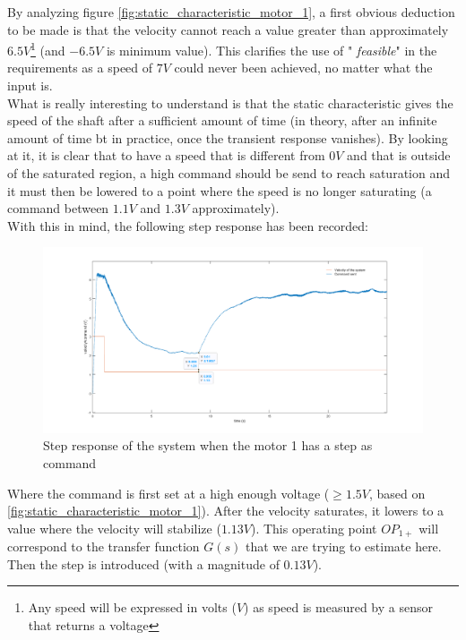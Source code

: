By analyzing figure \ref{fig:static_characteristic_motor_1}, a first obvious deduction to be made is that the velocity
cannot reach a value greater than approximately $6.5 V$\footnote{Any speed will be expressed in volts ($V$) as speed is
measured by a sensor that returns a voltage} (and $-6.5 V$ is minimum value). This clarifies the use of "\textit{
feasible}" in the requirements as a speed of $7 V$ could never been achieved, no matter what the input is.\\

What is really interesting to understand is that the static characteristic gives the speed of the shaft after a
sufficient amount of time (in theory, after an infinite amount of time bt in practice, once the transient response 
vanishes). By looking at it, it is clear that to have a speed that is different from $0 V$ and that is outside of the
saturated region, a high command should be send to reach saturation and it must then be lowered to a point where the
speed is no longer saturating (a command between $1.1 V$ and $1.3 V$ approximately).\\

With this in mind, the following step response has been recorded:

\begin{figure}[H]
    \centering
    \includegraphics[height=\textheight/3]{Pictures/step_response_positive_motor_1.png}
    \caption{Step response of the system when the motor 1 has a step as command}
    \label{fig:step_response_positive_motor_1}
\end{figure}


Where the command is first set at a high enough voltage ($\geq 1.5 V$, based on \ref{fig:static_characteristic_motor_1}). 
After the velocity saturates, it lowers to a value where the velocity will stabilize ($1.13 V$). This operating point 
\textit{$OP_{1+}$} will correspond to the transfer function $G(s)$ that we are trying to estimate here. Then the step is
introduced (with a magnitude of $0.13 V$).

